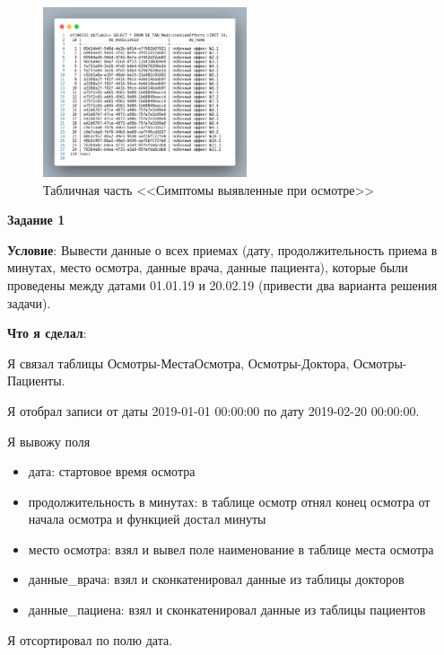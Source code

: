 \begin{figure}[p!h]
  \centering

  \includegraphics[height=5cm]
  {inc/DE_TAB_MedicineSideEffects.png}

  \caption{Табличная часть <<Симптомы выявленные при осмотре>>}

  \label{fig:DE_TAB_MedicineSideEffects}
\end{figure}

\newpage

\begin{center}
\textbf{Задание 1}
\end{center}

\textbf{Условие}:
Вывести данные о всех приемах (дату, продолжительность приема в минутах, место
осмотра, данные врача, данные пациента), которые были проведены между датами
01.01.19 и 20.02.19 (привести два варианта решения задачи).

\textbf{Что я сделал}:

Я связал таблицы Осмотры-МестаОсмотра, Осмотры-Доктора, Осмотры-Пациенты.

Я отобрал записи от даты 2019-01-01 00:00:00 по дату 2019-02-20 00:00:00.

Я вывожу поля
\begin{itemize}
  \item дата: стартовое время осмотра
  \item продолжительность в минутах: в таблице осмотр отнял конец осмотра от начала осмотра и функцией достал минуты
  \item место осмотра: взял и вывел поле наименование в таблице места осмотра
  \item данные\_врача: взял и сконкатенировал данные из таблицы докторов
  \item данные\_пациена: взял и сконкатенировал данные из таблицы пациентов
\end{itemize}

Я отсортировал по полю дата.



